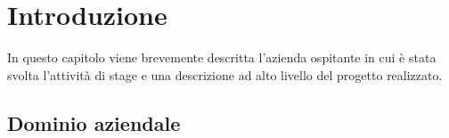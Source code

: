 
\chapter{Introduzione}
\label{cap:introduzione}
In questo capitolo viene brevemente descritta l’azienda ospitante in cui è stata
svolta l’attività di stage e una descrizione ad alto livello del progetto realizzato.





\section{Dominio aziendale}
